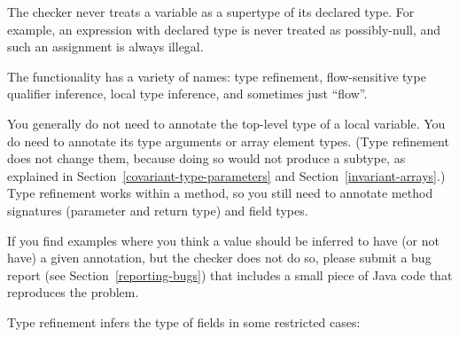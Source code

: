 The checker never treats a variable as
a supertype of its declared type.  For example, an expression with declared type 
is never treated as possibly-null, and such an assignment is always illegal.

The functionality has a variety of names:  type refinement,
flow-sensitive type qualifier inference, local type inference, and
sometimes just ``flow''.



You generally do not need to annotate the top-level type of a local variable.
You do need to annotate its type arguments or array element types.
(Type refinement does not change them, because doing so would not produce a
subtype, as explained in Section~\ref{covariant-type-parameters} and
Section~\ref{invariant-arrays}.)
Type refinement works within a method, so you still need to
annotate method signatures (parameter and return type) and field types.

If you find examples where you think a value should be inferred to have
(or not have) a
given annotation, but the checker does not do so, please submit a bug
report (see Section~\ref{reporting-bugs}) that includes a small piece of
Java code that reproduces the problem.



Type refinement infers the type of fields in some restricted cases:

